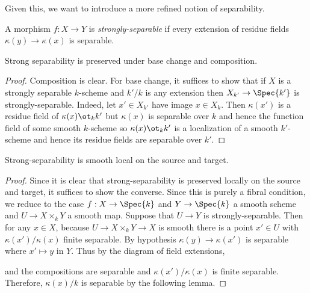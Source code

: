 \documentclass[12pt]{article}
\begin{document}
\begin{rmk}
Given this, we want to introduce a more refined notion of separability.
\end{rmk}

\begin{defn}
A morphism $f : X \to Y$ is \textit{strongly-separable} if every extension of residue fields $\kappa(y) \to \kappa(x)$ is separable.
\end{defn}

\begin{prop}
Strong separability is preserved under base change and composition.
\end{prop}

\begin{proof}
Composition is clear. For base change, it suffices to show that if $X$ is a strongly separable $k$-scheme and $k' / k$ is any extension then $X_{k'} \to \Spec{k'}$ is strongly-separable. Indeed, let $x' \in X_{k'}$ have image $x \in X_{k}$. Then $\kappa(x')$ is a residue field of $\kappa(x) \ot_k k'$ but $\kappa(x)$ is separable over $k$ and hence the function field of some smooth $k$-scheme so $\kappa(x) \ot_k k'$ is a localization of a smooth $k'$-scheme and hence its residue fields are separable over $k'$. 
\end{proof}

\begin{prop}
Strong-separability is smooth local on the source and target.
\end{prop}

\begin{proof}
Since it is clear that strong-separability is preserved locally on the source and target, it suffices to show the converse. Since this is purely a fibral condition, we reduce to the case $f : X \to \Spec{k}$ and $Y \to \Spec{k}$ a smooth scheme and $U \to X \times_k Y$ a smooth map. Suppose that $U \to Y$ is strongly-separable. Then for any $x \in X$, because $U \to X \times_k Y \to X$ is smooth there is a point $x' \in U$ with $\kappa(x') / \kappa(x)$ finite separable. By hypothesis $\kappa(y) \to \kappa(x')$ is separable where $x' \mapsto y$ in $Y$. Thus by the diagram of field extensions,
\begin{center}
\end{center}
and the compositions are separable and $\kappa(x') / \kappa(x)$ is finite separable. Therefore, $\kappa(x) / k$ is separable by the following lemma.
\end{proof}
\end{document}
